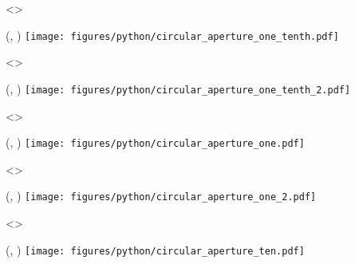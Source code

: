 \visible<\SLIDERED>{
    \begin{textblock}{\ANGDISTWIDTH}(\ANGDISTX , \ANGDISTY)
        \texttt{[image: figures/python/circular\_aperture\_one\_tenth.pdf]}
    \end{textblock}
}
\visible<\SLIDEYELLOW>{
    \begin{textblock}{\ANGDISTWIDTH}(\ANGDISTX , \ANGDISTY)
        \texttt{[image: figures/python/circular\_aperture\_one\_tenth\_2.pdf]}
    \end{textblock}
}
\visible<\SLIDEGREEN>{
    \begin{textblock}{\ANGDISTWIDTH}(\ANGDISTX , \ANGDISTY)
        \texttt{[image: figures/python/circular\_aperture\_one.pdf]}
    \end{textblock}
}
\visible<\SLIDEBLUE>{
    \begin{textblock}{\ANGDISTWIDTH}(\ANGDISTX , \ANGDISTY)
        \texttt{[image: figures/python/circular\_aperture\_one\_2.pdf]}
    \end{textblock}
}
\visible<\SLIDEVIOLET>{
    \begin{textblock}{\ANGDISTWIDTH}(\ANGDISTX , \ANGDISTY)
        \texttt{[image: figures/python/circular\_aperture\_ten.pdf]}
    \end{textblock}
}